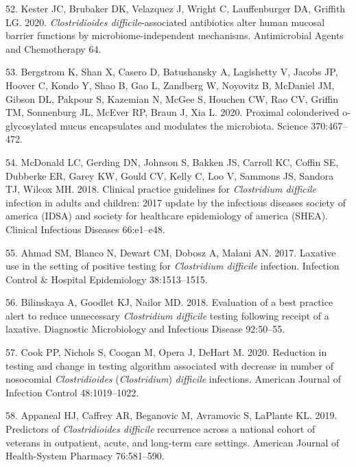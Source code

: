 \documentclass[
  11pt,
]{article}
\begin{document}
\leavevmode\hypertarget{ref-Kester2020}{}%
52. Kester JC, Brubaker DK, Velazquez J, Wright C, Lauffenburger DA,
Griffith LG. 2020. \emph{Clostridioides difficile}-associated
antibiotics alter human mucosal barrier functions by
microbiome-independent mechanisms. Antimicrobial Agents and Chemotherapy
64.

\leavevmode\hypertarget{ref-Bergstrom2020}{}%
53. Bergstrom K, Shan X, Casero D, Batushansky A, Lagishetty V, Jacobs
JP, Hoover C, Kondo Y, Shao B, Gao L, Zandberg W, Noyovitz B, McDaniel
JM, Gibson DL, Pakpour S, Kazemian N, McGee S, Houchen CW, Rao CV,
Griffin TM, Sonnenburg JL, McEver RP, Braun J, Xia L. 2020. Proximal
colonderived o-glycosylated mucus encapsulates and modulates the
microbiota. Science 370:467--472.

\leavevmode\hypertarget{ref-McDonald2018b}{}%
54. McDonald LC, Gerding DN, Johnson S, Bakken JS, Carroll KC, Coffin
SE, Dubberke ER, Garey KW, Gould CV, Kelly C, Loo V, Sammons JS, Sandora
TJ, Wilcox MH. 2018. Clinical practice guidelines for \emph{Clostridium
difficile} infection in adults and children: 2017 update by the
infectious diseases society of america (IDSA) and society for healthcare
epidemiology of america (SHEA). Clinical Infectious Diseases 66:e1--e48.

\leavevmode\hypertarget{ref-Ahmad2017}{}%
55. Ahmad SM, Blanco N, Dewart CM, Dobosz A, Malani AN. 2017. Laxative
use in the setting of positive testing for \emph{Clostridium difficile}
infection. Infection Control \& Hospital Epidemiology 38:1513--1515.

\leavevmode\hypertarget{ref-Bilinskaya2018}{}%
56. Bilinskaya A, Goodlet KJ, Nailor MD. 2018. Evaluation of a best
practice alert to reduce unnecessary \emph{Clostridium difficile}
testing following receipt of a laxative. Diagnostic Microbiology and
Infectious Disease 92:50--55.

\leavevmode\hypertarget{ref-Cook2020}{}%
57. Cook PP, Nichols S, Coogan M, Opera J, DeHart M. 2020. Reduction in
testing and change in testing algorithm associated with decrease in
number of nosocomial \emph{Clostridioides} (\emph{Clostridium})
\emph{difficile} infections. American Journal of Infection Control
48:1019--1022.

\leavevmode\hypertarget{ref-Appaneal2019}{}%
58. Appaneal HJ, Caffrey AR, Beganovic M, Avramovic S, LaPlante KL.
2019. Predictors of \emph{Clostridioides difficile} recurrence across a
national cohort of veterans in outpatient, acute, and long-term care
settings. American Journal of Health-System Pharmacy 76:581--590.
\end{document}
